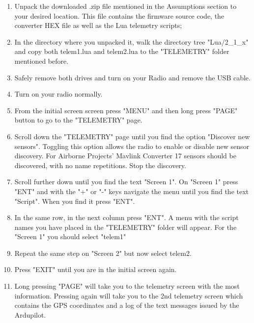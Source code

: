 \documentclass[english]{article}
\begin{document}
\begin{enumerate}
\item  Unpack the downloaded .zip file mentioned in the Assumptions section to your desired location. This file contains the firmware source code, the converter HEX file as well as the Lua telemetry scripts;

\item In the directory where you unpacked it, walk the directory tree "Lua/2\_1\_x" and copy both telem1.lua and telem2.lua to the "TELEMETRY" folder mentioned before.

\item Safely remove both drives and turn on your Radio and remove the USB cable.

\item Turn on your radio normally.

\item From the initial screen screen press "MENU" and then long press "PAGE" button to go to the "TELEMETRY" page.

\item Scroll down the "TELEMETRY" page until you find the option "Discover new sensors". Toggling this option allows the radio to enable or disable new sensor discovery. For Airborne Projects' Mavlink Converter 17 sensors should be discovered, with no name repetitions. Stop the discovery.

\item Scroll further down until you find the text "Screen 1". On "Screen 1" press "ENT" and with the "+" or "-" keys navigate the menu until you find the text "Script". When you find it press "ENT".

\item In the same row, in the next column press "ENT". A menu with the script names you have placed in the "TELEMETRY" folder will appear. For the "Screen 1" you should select "telem1"

\item Repeat the same step on "Screen 2" but now select telem2.

\item Press "EXIT" until you are in the initial screen again.

\item Long pressing "PAGE" will take you to the telemetry screen with the most information. Pressing again will take you to the 2nd telemetry screen which contains the GPS coordinates and a log of the text messages issued by the Ardupilot.

\end{enumerate}
\end{document}
